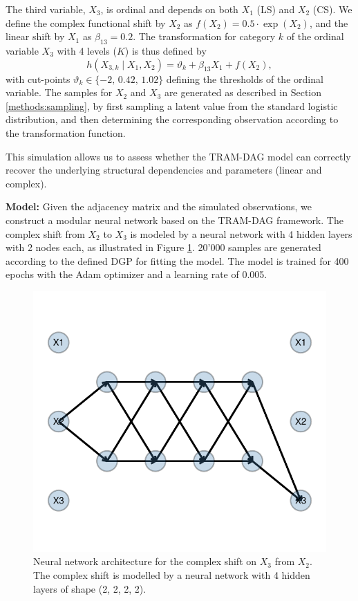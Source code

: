 The third variable, \(X_3\), is ordinal and depends on both \(X_1\) (LS) and \(X_2\) (CS). We define the complex functional shift by \(X_2\) as \(f(X_2) = 0.5 \cdot \exp(X_2)\), and the linear shift by \(X_1\) as \(\beta_{13} = 0.2\). The transformation for category \(k\) of the ordinal variable \(X_3\) with 4 levels ($K$) is thus defined by 
\[
h(X_{3,k} \mid X_1, X_2) = \vartheta_k + \beta_{13} X_1 + f(X_2),
\]
with cut-points \(\vartheta_k \in \{-2,\, 0.42,\, 1.02\}\) defining the thresholds of the ordinal variable. The samples for $X_2$ and $X_3$ are generated as described in Section \ref{methods:sampling}, by first sampling a latent value from the standard logistic distribution, and then determining the corresponding observation according to the transformation function.

This simulation allows us to assess whether the TRAM-DAG model can correctly recover the underlying structural dependencies and parameters (linear and complex). 


\textbf{Model:} Given the adjacency matrix and the simulated observations, we construct a modular neural network based on the TRAM-DAG framework. The complex shift from $X_2$ to $X_3$ is modeled by a neural network with 4 hidden layers with 2 nodes each, as illustrated in Figure \ref{fig:exp1_CS}. 20'000 samples are generated according to the defined DGP for fitting the model. The model is trained for 400 epochs with the Adam optimizer \citep{kingma2015} and a learning rate of 0.005. 



\begin{figure}[H]
\centering
\includegraphics[width=0.5\linewidth]{img/exp1_CS.pdf}
\caption{Neural network architecture for the complex shift on \( X_3 \) from \( X_2 \). The complex shift is modelled by a neural network with 4 hidden layers of shape (2, 2, 2, 2).}
\label{fig:exp1_CS}
\end{figure}




